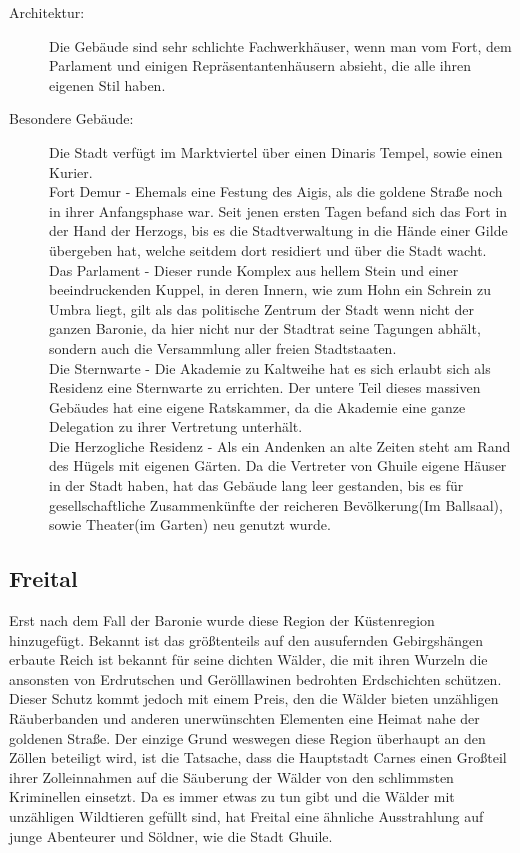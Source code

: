 \documentclass[a4paper,12pt,oneside]{book}
\begin{document}
\begin{description}
\item[Architektur:]Die Gebäude sind sehr schlichte Fachwerkhäuser, wenn man vom Fort, dem Parlament und einigen Repräsentantenhäusern absieht, die alle ihren eigenen Stil haben.
\item[Besondere Gebäude:]Die Stadt verfügt im Marktviertel über einen Dinaris Tempel, sowie einen Kurier.  
\\Fort Demur - Ehemals eine Festung des Aigis, als die goldene Straße noch in ihrer Anfangsphase war. Seit jenen ersten Tagen befand sich das Fort in der Hand der Herzogs, bis es die Stadtverwaltung in die Hände einer Gilde übergeben hat, welche seitdem dort residiert und über die Stadt wacht.
\\Das Parlament - Dieser runde Komplex aus hellem Stein und einer beeindruckenden Kuppel, in deren Innern, wie zum Hohn ein Schrein zu Umbra liegt, gilt als das politische Zentrum der Stadt wenn nicht der ganzen Baronie, da hier nicht nur der Stadtrat seine Tagungen abhält, sondern auch die Versammlung aller freien Stadtstaaten.
\\Die Sternwarte - Die Akademie zu Kaltweihe hat es sich erlaubt sich als Residenz eine Sternwarte zu errichten. Der untere Teil dieses massiven Gebäudes hat eine eigene Ratskammer, da die Akademie eine ganze Delegation zu ihrer Vertretung unterhält.
\\Die Herzogliche Residenz - Als ein Andenken an alte Zeiten steht am Rand des Hügels mit eigenen Gärten. Da die Vertreter von Ghuile eigene Häuser in der Stadt haben, hat das Gebäude lang leer gestanden, bis es für gesellschaftliche Zusammenkünfte der reicheren Bevölkerung(Im Ballsaal), sowie Theater(im Garten) neu genutzt wurde.
\end{description}

\subsection{Freital}
Erst nach dem Fall der Baronie wurde diese Region der Küstenregion hinzugefügt. Bekannt ist das größtenteils auf den ausufernden Gebirgshängen erbaute Reich ist bekannt für seine dichten Wälder, die mit ihren Wurzeln die ansonsten von Erdrutschen und Gerölllawinen bedrohten Erdschichten schützen. Dieser Schutz kommt jedoch mit einem Preis, den die Wälder bieten unzähligen Räuberbanden und anderen unerwünschten Elementen eine Heimat nahe der goldenen Straße. Der einzige Grund weswegen diese Region überhaupt an den Zöllen beteiligt wird, ist die Tatsache, dass die Hauptstadt Carnes einen Großteil ihrer Zolleinnahmen auf die Säuberung der Wälder von den schlimmsten Kriminellen einsetzt. Da es immer etwas zu tun gibt und die Wälder mit unzähligen Wildtieren gefüllt sind, hat Freital eine ähnliche Ausstrahlung auf junge Abenteurer und Söldner, wie die Stadt Ghuile.
\end{document}
